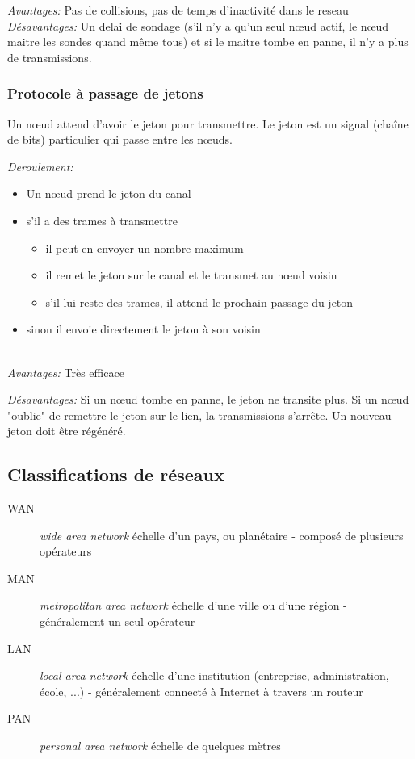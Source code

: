 \documentclass[a4paper, 12pt, french]{article}
\begin{document}
	\emph{Avantages:} Pas de collisions, pas de temps d'inactivité dans le reseau
	\emph{Désavantages:} Un delai de sondage (s'il n'y a qu'un seul nœud actif, le nœud maitre les sondes quand même tous) et si le maitre tombe en panne, il n'y a plus de transmissions.

	\subsubsection{Protocole à passage de jetons}

	Un nœud attend d'avoir le jeton pour transmettre. Le jeton est un signal (chaîne de bits) particulier qui passe entre les nœuds.

	\emph{Deroulement:}
	\begin{itemize}
		\item Un nœud prend le jeton du canal
		\item s'il a des trames à transmettre
		\begin{itemize}
			\item il peut en envoyer un nombre maximum
			\item il remet le jeton sur le canal et le transmet au nœud voisin
			\item s'il lui reste des trames, il attend le prochain passage du jeton
		\end{itemize}
		\item sinon il envoie directement le jeton à son voisin
	\end{itemize}\mbox{}\\

	\emph{Avantages:} Très efficace

	\emph{Désavantages:} Si un nœud tombe en panne, le jeton ne transite plus. Si un nœud "oublie" de remettre le jeton sur le lien, la transmissions s'arrête. Un nouveau jeton doit être régénéré.

	\subsection{Classifications de réseaux}

	\begin{description}
		\item[WAN] \emph{wide area network} échelle d'un pays, ou planétaire - composé de plusieurs opérateurs
		\item[MAN] \emph{metropolitan area network} échelle d'une ville ou d'une région - généralement un seul opérateur
		\item[LAN] \emph{local area network} échelle d'une institution (entreprise, administration, école, ...) - généralement connecté à Internet à travers un routeur
		\item[PAN] \emph{personal area network} échelle de quelques mètres
	\end{description}
\end{document}
